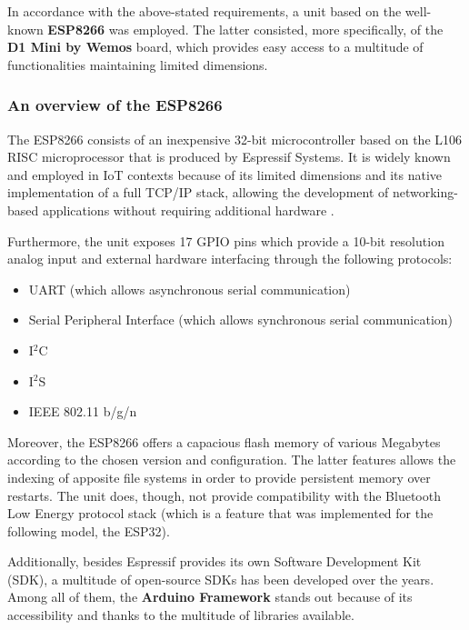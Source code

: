 In accordance with the above-stated requirements, a unit based on the well-known \textbf{ESP8266} was employed. The latter consisted, more specifically, of the \textbf{D1 Mini by Wemos} board, which provides easy access to a multitude of functionalities maintaining limited dimensions.

\subsubsection{An overview of the ESP8266}\label{sec:esp8266}


The ESP8266 consists of an inexpensive 32-bit microcontroller based on the L106 RISC microprocessor that is produced by Espressif Systems. It is widely known and employed in IoT contexts because of its limited dimensions and its native implementation of a full TCP/IP stack, allowing the development of networking-based applications without requiring additional hardware \cite{esp8266}.

Furthermore, the unit exposes 17 GPIO pins which provide a 10-bit resolution analog input and external hardware interfacing through the following protocols:

\begin{itemize}
    \item UART (which allows asynchronous serial communication)
    \item Serial Peripheral Interface (which allows synchronous serial communication)
    \item I$^2$C
    \item I$^2$S
    \item IEEE 802.11 b/g/n
\end{itemize}

Moreover, the ESP8266 offers a capacious flash memory of various Megabytes according to the chosen version and configuration. The latter features allows the indexing of apposite file systems in order to provide persistent memory over restarts. The unit does, though, not provide compatibility with the Bluetooth Low Energy protocol stack (which is a feature that was implemented for the following model, the ESP32).

Additionally, besides Espressif provides its own Software Development Kit (SDK), a multitude of open-source SDKs has been developed over the years. Among all of them, the \textbf{Arduino Framework} stands out because of its accessibility and thanks to the multitude of libraries available. 

